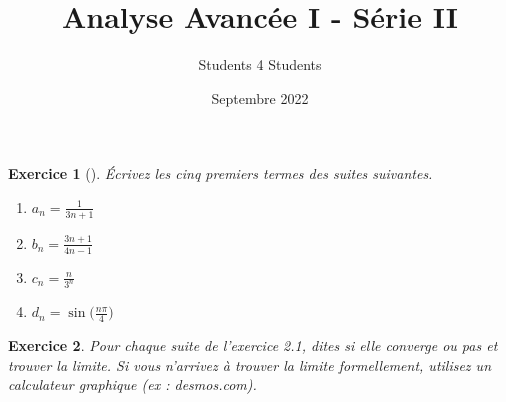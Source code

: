 \documentclass[11pt,french,table]{article}
\title{Analyse Avancée I - Série II}
\author{Students 4 Students}
\date{Septembre 2022}
\theoremstyle{exercice}
\newtheorem{exercice}{Exercice}
\begin{document}
\maketitle



\begin{exercice}[]

Écrivez les cinq premiers termes des suites suivantes. 
\begin{multicols}{2}
  \begin{enumerate}
   
        \item[(a)] $a_n=\frac{1}{3n+1}$
        \item[(b)] $b_n=\frac{3n+1}{4n-1}$
   
    \columnbreak  %
    \item[(c)] $c_n=\frac{n}{3^n}$
    \item[(d)] $d_n = \sin{\big(\frac{n\pi}{4}\big)}$
     \end{enumerate}
\end{multicols}

\end{exercice}
\vspace{1em}
\begin{exercice}
Pour chaque suite de l'exercice 2.1, dites si elle converge ou pas et trouver la limite. Si vous n'arrivez à trouver la limite formellement, utilisez un calculateur graphique (ex : desmos.com). 
\end{exercice}
\vspace{1em}
\end{document}
